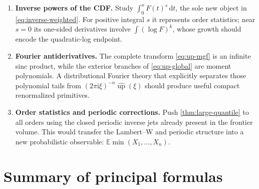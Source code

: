 \documentclass[11pt,oneside]{article}
\theoremstyle{definition}
\theoremstyle{remark}
\newcommand{\Up}{\operatorname{up}}
\newcommand{\E}{\mathbb E}
\newcommand{\dd}{\,\mathrm d}
\newcommand{\ii}{\mathrm i}
\newcommand{\1}{\mathbf 1}
\begin{document}
\begin{enumerate}
\item \textbf{Inverse powers of the CDF.}  Study
\(\int_0^xF(t)^s\dd t\), the sole new object in
\eqref{eq:inverse-weighted}.  For positive integral \(s\) it represents order
statistics; near \(s=0\) its one-sided derivatives involve
\(\int(\log F)^k\), whose growth should encode the quadratic-log endpoint.

\item \textbf{Fourier antiderivatives.}  The complete transform
\eqref{eq:up-mgf} is an infinite sinc product, while the exterior branches of
\eqref{eq:up-global} are moment polynomials.  A distributional Fourier theory
that explicitly separates those polynomial tails from
\((2\pi\ii\xi)^{-n}\widehat{\Up}(\xi)\) should produce useful compact
renormalized primitives.

\item \textbf{Order statistics and periodic corrections.}  Push
\cref{thm:large-quantile} to all orders using the closed periodic inverse jets
already present in the frontier volume.  This would transfer the Lambert--W
and periodic structure into a new probabilistic observable:
\(\E\min(X_1,\ldots,X_n)\).
\end{enumerate}

\section{Summary of principal formulas}
\end{document}
